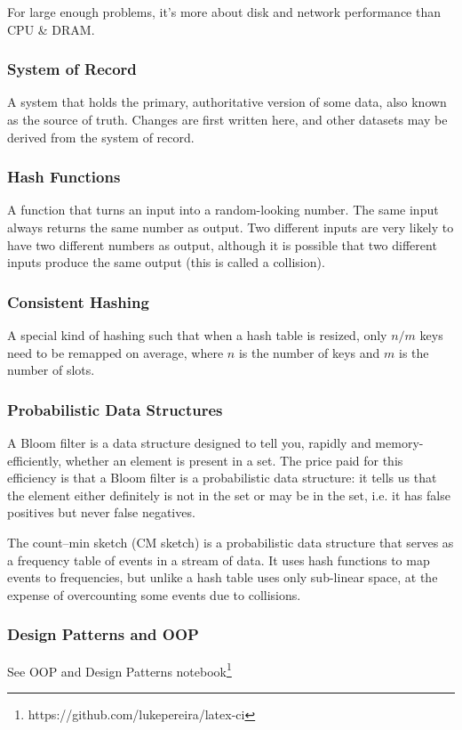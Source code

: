 \documentclass{article}
\begin{document}
    For large enough problems, it’s more about disk and network performance than CPU \& DRAM.
    
    \subsubsection{System of Record}
    A system that holds the primary, authoritative version of some data, also known as  the source of truth. Changes are first written here, and other datasets may be derived from the system of record.
    
    \subsubsection{Hash Functions}
    A function that turns an input into a random-looking number. The same input always returns the same number as output. Two different inputs are very likely to have two different numbers as output,  although it is possible that two different inputs produce the same output (this is called a collision).
    
    \subsubsection{Consistent Hashing}
    A special kind of hashing such that when a hash table is resized, only $n/m$ keys need to be remapped on average, where $n$ is the number of keys and $m$ is the number of slots.
    
    \subsubsection{Probabilistic Data Structures}
    A Bloom filter is a data structure designed to tell you, rapidly and memory-efficiently, whether an element is present in a set. The price paid for this efficiency is that a Bloom filter is a probabilistic data structure: it tells us that the element either definitely is not in the set or may be in the set, i.e. it has false positives but never false negatives.
    
    The count–min sketch (CM sketch) is a probabilistic data structure that serves as a frequency table of events in a stream of data. It uses hash functions to map events to frequencies, but unlike a hash table uses only sub-linear space, at the expense of overcounting some events due to collisions.
    
    \subsubsection{Design Patterns and OOP}
    See OOP and Design Patterns notebook\footnote{https://github.com/lukepereira/latex-ci}
    
\end{document}
